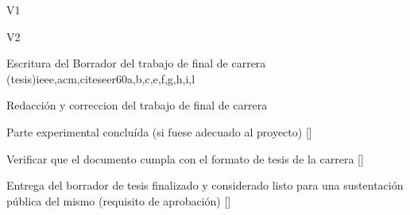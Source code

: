 \begin{syllabus}
\begin{competences}{V1}
\item {} 
\item {}
\item {}
\end{competences}

\begin{competences}{V2}
\item {} 
\item {}
\item {}
\end{competences}

\begin{unit}{Escritura del Borrador del trabajo de final de carrera (tesis)}{}{ieee,acm,citeseer}{60}{a,b,c,e,f,g,h,i,l}
\begin{topics}
    \item Redacción y correccion del trabajo de final de carrera
\end{topics}

\begin{learningoutcomes}
    \item Parte experimental concluída (si fuese adecuado al proyecto) [\Assessment]
    \item Verificar que el documento cumpla con el formato de tesis de la carrera [\Assessment]
    \item Entrega del borrador de tesis finalizado y considerado listo para una sustentación pública del mismo (requisito de aprobación) [\Assessment]
\end{learningoutcomes}
\end{unit}

\begin{coursebibliography}
\end{coursebibliography}
\end{syllabus}
